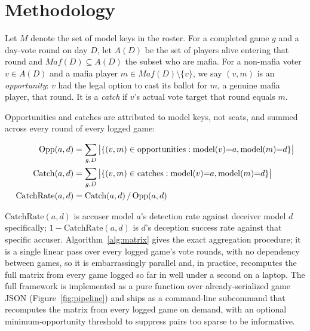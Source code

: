 \documentclass{article}
\begin{document}
\section{Methodology}
\label{sec:methodology}

Let $M$ denote the set of model keys in the roster. For a completed game $g$ and a day-vote round on day $D$, let $A(D)$ be the set of players alive entering that round and $\mathit{Maf}(D) \subseteq A(D)$ the subset who are mafia. For a non-mafia voter $v \in A(D)$ and a mafia player $m \in \mathit{Maf}(D) \setminus \{v\}$, we say $(v,m)$ is an \textit{opportunity}: $v$ had the legal option to cast its ballot for $m$, a genuine mafia player, that round. It is a \textit{catch} if $v$'s actual vote target that round equals $m$.

Opportunities and catches are attributed to model keys, not seats, and summed across every round of every logged game:

\begin{align}
\mathrm{Opp}(a,d) &= \sum_{g,D} \big|\{(v,m) \in \mathrm{opportunities} : \mathrm{model}(v){=}a, \mathrm{model}(m){=}d\}\big| \notag\\
\mathrm{Catch}(a,d) &= \sum_{g,D} \big|\{(v,m) \in \mathrm{catches} : \mathrm{model}(v){=}a, \mathrm{model}(m){=}d\}\big| \notag\\
\mathrm{CatchRate}(a,d) &= \mathrm{Catch}(a,d) \,/\, \mathrm{Opp}(a,d) \notag
\end{align}

$\mathrm{CatchRate}(a,d)$ is accuser model $a$'s detection rate against deceiver model $d$ specifically; $1-\mathrm{CatchRate}(a,d)$ is $d$'s deception success rate against that specific accuser. Algorithm~\ref{alg:matrix} gives the exact aggregation procedure; it is a single linear pass over every logged game's vote rounds, with no dependency between games, so it is embarrassingly parallel and, in practice, recomputes the full matrix from every game logged so far in well under a second on a laptop. The full framework is implemented as a pure function over already-serialized game JSON (Figure~\ref{fig:pipeline}) and ships as a command-line subcommand that recomputes the matrix from every logged game on demand, with an optional minimum-opportunity threshold to suppress pairs too sparse to be informative.
\end{document}
